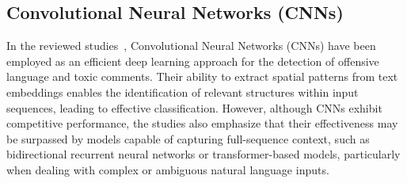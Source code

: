\subsection{Convolutional Neural Networks (CNNs)}
In the reviewed studies~\cite{offensive2021,comparison2021,hatespeech2021}, Convolutional Neural Networks (CNNs) have been employed as an efficient deep learning approach for the detection of offensive language and toxic comments. Their ability to extract spatial patterns from text embeddings enables the identification of relevant structures within input sequences, leading to effective classification. However, although CNNs exhibit competitive performance, the studies also emphasize that their effectiveness may be surpassed by models capable of capturing full-sequence context, such as bidirectional recurrent neural networks or transformer-based models, particularly when dealing with complex or ambiguous natural language inputs.
